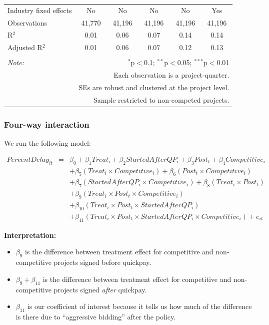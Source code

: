 \documentclass[
]{article}
\providecommand{\tightlist}{%
  \setlength{\itemsep}{0pt}\setlength{\parskip}{0pt}}
\begin{document}
\begin{table}[H]
\begin{tabular}{@{\extracolsep{-2pt}}lccccc}
Industry fixed effects & No & No & No & No & Yes \\ 
Observations & 41,770 & 41,196 & 41,196 & 41,196 & 41,196 \\ 
R$^{2}$ & 0.01 & 0.06 & 0.07 & 0.14 & 0.14 \\ 
Adjusted R$^{2}$ & 0.01 & 0.06 & 0.07 & 0.12 & 0.13 \\ 
\hline 
\hline \\[-1.8ex] 
\textit{Note:}  & \multicolumn{5}{r}{$^{*}$p$<$0.1; $^{**}$p$<$0.05; $^{***}$p$<$0.01} \\ 
 & \multicolumn{5}{r}{Each observation is a project-quarter.} \\ 
 & \multicolumn{5}{r}{SEs are robust and clustered at the project level.} \\ 
 & \multicolumn{5}{r}{Sample restricted to non-competed projects.} \\ 
\end{tabular} 
\end{table}

\hypertarget{four-way-interaction}{%
\subsubsection{Four-way interaction}\label{four-way-interaction}}

We run the following model:

\[\begin{aligned} PercentDelay_{it} &=& \beta_0 +\beta_1 Treat_i+ \beta_2 StartedAfterQP_i+ \beta_3 Post_t+ \beta_4 Competitive_i\\ && +  \beta_5 (Treat_i \times Competitive_i) + \beta_6 (Post_t \times Competitive_i)\\ && +  \beta_7 (StartedAfterQP_i \times Competitive_i) +\beta_8 (Treat_i \times Post_t)\\ && + \beta_9 (Treat_i \times Post_t \times Competitive_i) \\ && + \beta_{10} (Treat_i \times Post_t \times StartedAfterQP_i )\\ && + \beta_{11} (Treat_i \times Post_t \times StartedAfterQP_i \times Competitive_i) + e_{it} \end{aligned}\]

\textbf{Interpretation:}

\begin{itemize}
\tightlist
\item
  \(\beta_9\) is the difference between treatment effect for competitive
  and non-competitive projects signed before quickpay.
\item
  \(\beta_9 + \beta_{11}\) is the difference between treatment effect
  for competitive and non-competitive projects signed \emph{after}
  quickpay.
\item
  \(\beta_{11}\) is our coefficient of interest because it tells us how
  much of the difference is there due to ``aggressive bidding'' after
  the policy.
\end{itemize}
\end{document}
